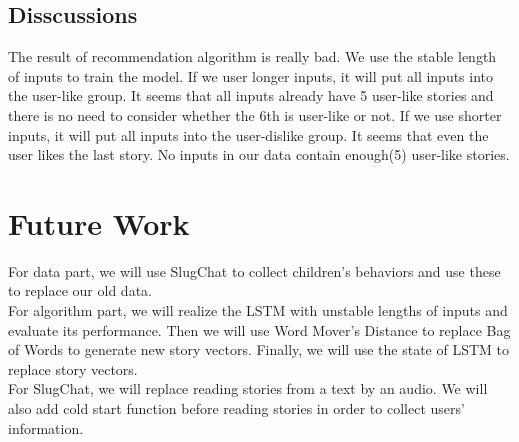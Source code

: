 \documentclass[sigconf]{acmart}
\begin{document}
\subsection{Disscussions}
The result of recommendation algorithm is really bad. We use the stable length of inputs to train the model. If we user longer inputs, it will put all inputs into the user-like group. It seems that all inputs already have 5 user-like stories and there is no need to consider whether the 6th is user-like or not. If we use shorter inputs, it will put all inputs into the user-dislike group. It seems that even the user likes the last story. No inputs in our data contain enough(5) user-like stories.

\section{Future Work}
For data part, we will use SlugChat to collect children's behaviors and use these to replace our old data.
\\
For algorithm part, we will realize the LSTM with unstable lengths of inputs and evaluate its performance. Then we will use Word Mover's Distance to replace Bag of Words to generate new story vectors. Finally, we will use the state of LSTM to replace story vectors.
\\
For SlugChat, we will replace reading stories from a text by an audio. We will also add cold start function before reading stories in order to collect users' information.
\end{document}
